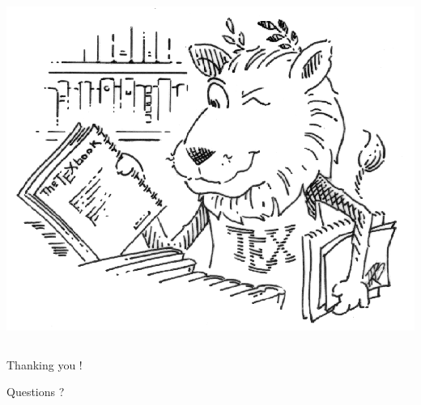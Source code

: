 \documentclass[]{beamer} %
\begin{document}
\begin{frame}[plain]
\begin{columns}[c]
\begin{column}{.75\textwidth}
 \includegraphics[width=\textwidth]{Logo/CTAN_Lion.png}
\end{column}
\end{columns}
\end{frame}


\begin{frame}[plain]

{\Large \color{red} Thanking you ! }

   \medskip

{\Large \color{white} Questions ?}
\end{frame}
\end{document}

